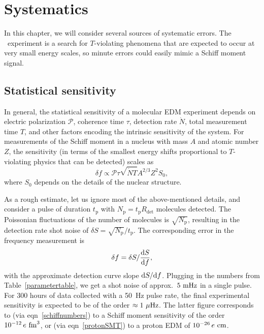 \section{Systematics}
\label{section:systematics}

In this chapter, we will consider several sources of systematic errors. The
\CENTREX\ experiment is a search for $T$-violating phenomena that are expected
to occur at very small energy scales, so minute errors could easily mimic a
Schiff moment signal.

\subsection{Statistical sensitivity}

In general, the statistical sensitivity of a molecular \gls{EDM} experiment
depends on electric polarization $\mathcal{P}$, coherence time $\tau$, detection
rate $\dot N$, total measurement time $T$, and other factors encoding the
intrinsic sensitivity of the system. For measurements of the Schiff moment in a
nucleus with mass $A$ and atomic number $Z$, the sensitivity (in terms of the
smallest energy shifts proportional to $T$-violating physics that can be
detected) scales as
%
\[
    \delta f\propto\mathcal{P}\tau\sqrt{\dot N T}A^{2/3}Z^2S_0,
\]
%
where $S_0$ depends on the details of the nuclear structure.
\cite{khriplovich2012cp}

As a rough estimate, let us ignore most of the above-mentioned details, and
consider a pulse of duration $t_\text{p}$ with
$N_\text{p}=t_\text{p}R_\text{det}$ molecules detected. The Poissonian fluctuations of
the number of molecules is $\sqrt{N_\text{p}}$, resulting in the detection rate
shot noise of $\delta S=\sqrt{N_\text{p}}/t_\text{p}$. The corresponding error
in the frequency measurement is
%
\[
    \delta f=\delta S/\frac{\mathrm{d} S}{\mathrm{d} f},
\]
with the approximate detection curve slope $\mathrm{d} S/\mathrm{d} f$. Plugging in the numbers
from Table~\ref{parametertable}, we get a shot noise of approx.\ $5~\mathrm{mHz}$ in a
single pulse. For 300 hours of data collected with a 50~Hz pulse rate, the final
experimental sensitivity is expected to be of the order $\approx1~\mathrm{\mu Hz}$. The
latter figure corresponds to (via eqn~\ref{schiffnumbers}) to a Schiff moment
sensitivity of the order $10^{-12}\,e~\mathrm{fm}^3$, or (via eqn~\ref{protonSMT}) to a
proton \gls{EDM} of $10^{-26}\,e~\mathrm{cm}$.

